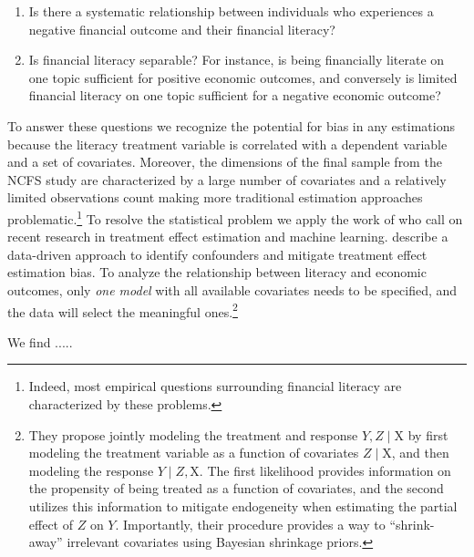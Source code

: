 \documentclass[12pt]{article}
\theoremstyle{plain}
\begin{document}
\begin{enumerate}
\item Is there a systematic relationship between individuals who experiences a negative financial outcome and their financial literacy?
\item Is financial literacy separable?  For instance, is being financially literate on one topic sufficient for positive economic outcomes, and conversely is limited financial literacy on one topic sufficient for a negative economic outcome? 
\end{enumerate}

To answer these questions we recognize the potential for bias in any estimations because the literacy treatment variable is correlated with a dependent variable and a set of covariates.  Moreover, the dimensions of the final sample from the NCFS study are characterized by a large number of covariates and a relatively limited observations count making more traditional estimation approaches problematic.\footnote{Indeed, most empirical questions surrounding financial literacy are characterized by these problems.}  To resolve the statistical problem we apply the work of \cite{hahn2018regularization} who call on recent research in treatment effect estimation and machine learning.  \cite{hahn2018regularization} describe a data-driven approach to identify confounders and mitigate treatment effect estimation bias.  To analyze the relationship between literacy and economic outcomes, only \textit{one model} with all available covariates needs to be specified, and the data will select the meaningful ones.\footnote{  They propose jointly modeling the treatment and response $Y,Z \mid \text{X}$ by first modeling the treatment variable as a function of covariates $Z \mid \text{X}$, and then modeling the response $Y \mid Z,\text{X}$.  The first likelihood provides information on the propensity of being treated as a function of covariates, and the second utilizes this information to mitigate endogeneity when estimating the partial effect of $Z$ on $Y$. Importantly, their procedure provides a way to ``shrink-away'' irrelevant covariates using Bayesian shrinkage priors.}

 
We find .....
\end{document}
